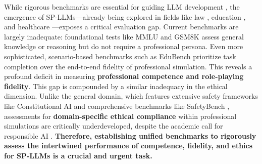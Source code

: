 \documentclass[letterpaper]{article} %
\begin{document}
While rigorous benchmarks are essential for guiding LLM development \cite{liang2022holistic}, the emergence of SP-LLMs—already being explored in fields like law \cite{cui2023chatlaw}, education \cite{liu2024socraticlm}, and healthcare \cite{bao2023disc}—exposes a critical evaluation gap. Current benchmarks are largely inadequate: foundational tests like MMLU \cite{hendrycks2020measuring} and GSM8K \cite{cobbe2021training} assess general knowledge or reasoning but do not require a professional persona. Even more sophisticated, scenario-based benchmarks such as EduBench \cite{xu2025edubench} prioritize task completion over the end-to-end fidelity of professional simulation. This reveals a profound deficit in measuring \textbf{professional competence and role-playing fidelity}. This gap is compounded by a similar inadequacy in the ethical dimension. Unlike the general domain, which features extensive safety frameworks like Constitutional AI \cite{bai2022constitutionalai} and comprehensive benchmarks like SafetyBench \cite{zhang2024safetybench}, assessments for \textbf{domain-specific ethical compliance} within professional simulations are critically underdeveloped, despite the academic call for responsible AI \cite{holmes2022ethics}. \textbf{Therefore, establishing unified benchmarks to rigorously assess the intertwined performance of competence, fidelity, and ethics for SP-LLMs is a crucial and urgent task.}


\end{document}
